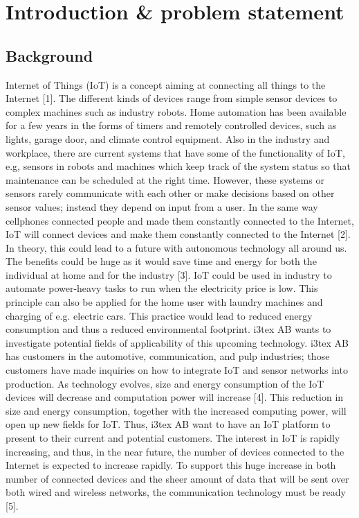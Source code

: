\section{Introduction \& problem statement}

\subsection{Background}

Internet of Things (IoT) is a concept aiming at connecting all things to the Internet [1].
The different kinds of devices range from simple sensor devices to complex machines such as industry robots.
Home automation has been available for a few years in the forms of timers and remotely controlled devices,
	such as lights,
	garage door,
	and climate control equipment.
Also in the industry and workplace,
	there are current systems that have some of the functionality of IoT,
	e.g,
	sensors in robots and machines which keep track of the system status so that maintenance can be scheduled at the right time.
However,
	these systems or sensors rarely communicate with each other or make decisions based on other sensor values;
	instead they depend on input from a user.
In the same way cellphones connected people and made them constantly connected to the Internet,
	IoT will connect devices and make them constantly connected to the Internet [2].
In theory,
	this could lead to a future with autonomous technology all around us.
The benefits could be huge as it would save time and energy for both the individual at home and for the industry [3].
IoT could be used in industry to automate power-heavy tasks to run when the electricity price is low.
This principle can also be applied for the home user with laundry machines and charging of e.g.
electric cars.
This practice would lead to reduced energy consumption and thus a reduced environmental footprint.
i3tex AB wants to investigate potential fields of applicability of this upcoming technology.
i3tex AB has customers in the automotive,
	communication,
	and pulp industries;
	those customers have made inquiries on how to integrate IoT and sensor networks into production.
As technology evolves,
	size and energy consumption of the IoT devices will decrease and computation power will increase [4].
This reduction in size and energy consumption,
	together with the increased computing power,
	will open up new fields for IoT.
Thus,
	i3tex AB want to have an IoT platform to present to their current and potential customers.
The interest in IoT is rapidly increasing,
	and thus,
	in the near future,
	the number of devices connected to the Internet is expected to increase rapidly.
To support this huge increase in both number of connected devices and the sheer amount of data that will be sent over both wired and wireless networks,
	the communication technology must be ready [5].
	
